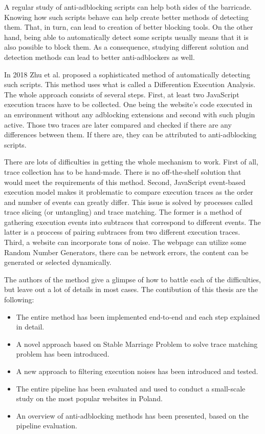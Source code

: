 A regular study of anti-adblocking scripts can help both sides of the barricade. Knowing how such scripts behave
can help create better methods of detecting them. That, in turn, can lead to creation of better blocking tools.
On the other hand, being able to automatically detect some scripts usually means that it is also possible
to block them. As a consequence, studying different solution and detection methods can lead to better anti-adblockers as well.

In 2018 Zhu et al. \cite{DBLP:conf/ndss/ZhuHQSY18} proposed a sophisticated method of automatically detecting such
scripts. This method uses what is called a Differention Execution Analysis. The whole approach consists of several steps.
First, at least two JavaScript execution traces have to be collected. One being the website's code executed
in an environment without any adblocking extensions and second with such plugin active.
Those two traces are later compared and checked if there are any differences between them.
If there are, they can be attributed to anti-adblocking scripts.

There are lots of difficulties in getting the whole mechanism to work. First of all, trace collection has
to be hand-made. There is no off-the-shelf solution that would meet the requirements of this method.
Second, JavaScript event-based execution model makes it problematic to compare execution traces
as the order and number of events can greatly differ. This issue is solved 
by processes called trace slicing (or untangling) and trace matching. The former is a method of gathering 
execution events into subtraces that correspond to different events. The latter is a proccess of
pairing subtraces from two different execution traces.
Third, a website can incorporate tons of noise. The webpage can utilize some Random Number Generators, 
there can be network errors, the content can be generated or selected dynamically.

The authors of the method give a glimpse of how to battle each of the difficulties, 
but leave out a lot of details in most cases. The contibution of this thesis are the following:
\begin{itemize}
  \item The entire method has been implemented end-to-end and each step explained in detail.
  \item A novel approach based on Stable Marriage Problem to solve trace matching problem
           has been introduced.
  \item A new approach to filtering execution noises has been introduced and tested.
  \item The entire pipeline has been evaluated and used to conduct a small-scale study on the most
           popular websites in Poland.
  \item An overview of anti-adblocking methods has been presented, based on the pipeline evaluation.
\end{itemize}

